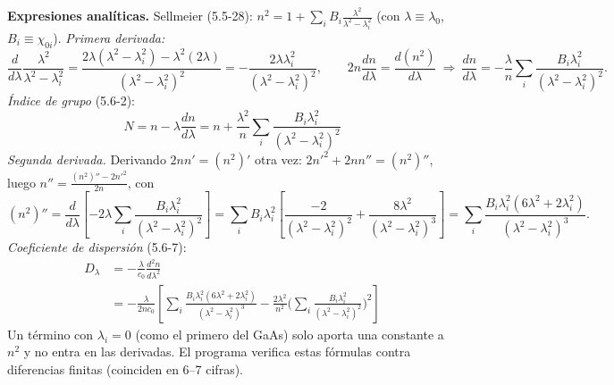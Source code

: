 
\label{sol:15}

 \textbf{Expresiones analíticas.} Sellmeier (5.5-28): $n^2=1+\sum_iB_i\frac{\lambda^2}{\lambda^2-\lambda_i^2}$
(con $\lambda\equiv\lambda_0$, $B_i\equiv\chi_{0i}$). \emph{Primera derivada:}
\[
\frac{d}{d\lambda}\frac{\lambda^2}{\lambda^2-\lambda_i^2}=\frac{2\lambda(\lambda^2-\lambda_i^2)-\lambda^2(2\lambda)}{(\lambda^2-\lambda_i^2)^2}
=-\frac{2\lambda\lambda_i^2}{(\lambda^2-\lambda_i^2)^2},
\qquad
2n\frac{dn}{d\lambda}=\frac{d(n^2)}{d\lambda}
\ \Longrightarrow\
\frac{dn}{d\lambda}=-\frac{\lambda}{n}\sum_i\frac{B_i\lambda_i^2}{(\lambda^2-\lambda_i^2)^2}.
\]
\emph{Índice de grupo} (5.6-2):
\[
\boxed{N=n-\lambda\frac{dn}{d\lambda}=n+\frac{\lambda^2}{n}\sum_i\frac{B_i\lambda_i^2}{(\lambda^2-\lambda_i^2)^2}}
\]
\emph{Segunda derivada.} Derivando $2nn'=(n^2)'$ otra vez: $2n'^2+2nn''=(n^2)''$, luego
$n''=\frac{(n^2)''-2n'^2}{2n}$, con
\[
(n^2)''=\frac{d}{d\lambda}\left[-2\lambda\sum_i\frac{B_i\lambda_i^2}{(\lambda^2-\lambda_i^2)^2}\right]
=\sum_iB_i\lambda_i^2\left[\frac{-2}{(\lambda^2-\lambda_i^2)^2}+\frac{8\lambda^2}{(\lambda^2-\lambda_i^2)^3}\right]
=\sum_i\frac{B_i\lambda_i^2(6\lambda^2+2\lambda_i^2)}{(\lambda^2-\lambda_i^2)^3}.
\]
\emph{Coeficiente de dispersión} (5.6-7):
\[
\boxed{\begin{aligned}D_\lambda&=-\frac{\lambda}{c_0}\frac{d^2n}{d\lambda^2}\\
&=-\frac{\lambda}{2nc_0}\left[\sum_i\frac{B_i\lambda_i^2(6\lambda^2+2\lambda_i^2)}{(\lambda^2-\lambda_i^2)^3}-\frac{2\lambda^2}{n^2}\Big(\sum_i\frac{B_i\lambda_i^2}{(\lambda^2-\lambda_i^2)^2}\Big)^2\right]\end{aligned}}
\]
Un término con $\lambda_i=0$ (como el primero del GaAs) solo aporta una constante a $n^2$ y no entra
en las derivadas. El programa verifica estas fórmulas contra diferencias finitas (coinciden en 6--7 cifras).

